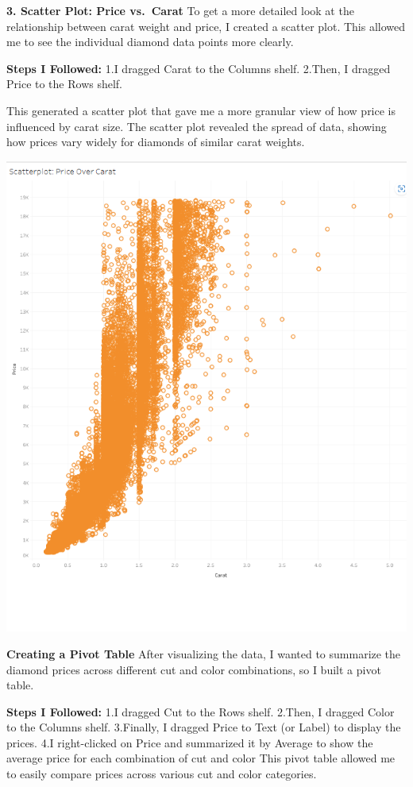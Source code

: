 \documentclass[
  letterpaper,
  DIV=11,
  numbers=noendperiod]{scrreprt}
\begin{document}
\textbf{3. Scatter Plot: Price vs.~Carat} To get a more detailed look at
the relationship between carat weight and price, I created a scatter
plot. This allowed me to see the individual diamond data points more
clearly.

\textbf{Steps I Followed:} 1.I dragged Carat to the Columns shelf.
2.Then, I dragged Price to the Rows shelf.

This generated a scatter plot that gave me a more granular view of how
price is influenced by carat size. The scatter plot revealed the spread
of data, showing how prices vary widely for diamonds of similar carat
weights.

\includegraphics{ScatterPlot_Price Over Carat.png}

\textbf{Creating a Pivot Table} After visualizing the data, I wanted to
summarize the diamond prices across different cut and color
combinations, so I built a pivot table.

\textbf{Steps I Followed:} 1.I dragged Cut to the Rows shelf. 2.Then, I
dragged Color to the Columns shelf. 3.Finally, I dragged Price to Text
(or Label) to display the prices. 4.I right-clicked on Price and
summarized it by Average to show the average price for each combination
of cut and color This pivot table allowed me to easily compare prices
across various cut and color categories.
\end{document}
